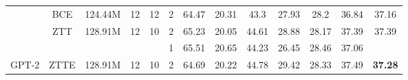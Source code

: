 \begin{table*}[ht]
\begin{tabular}{cc|c|c|c|c|ccccc|c|c}
\multicolumn{1}{c|}{}                                                                         & \multirow{-2}{*}{BCE}                         & \multirow{-2}{*}{124.44M}                         & \multirow{-2}{*}{12}                                           & \multirow{-2}{*}{12}                                              & 2                                                              & 64.47                         & 20.31                         & 43.3                          & 27.93                         & 28.2                          & 36.84                         & \multirow{-2}{*}{37.16}                                  \\ \cline{2-13} 
\multicolumn{1}{c|}{}                                                                         & ZTT                                            & 128.91M                                           & 12                                                             & 10                                                                & 2                                                              & 65.23                         & 20.05                         & 44.61                         & 28.88                         & 28.17                         & 37.39                         & 37.39                                                    \\ \cline{2-13} 
\multicolumn{1}{c|}{}                                                                         & \cellcolor[HTML]{C0C0C0}                      & \cellcolor[HTML]{C0C0C0}                          & \cellcolor[HTML]{C0C0C0}                                       & \cellcolor[HTML]{C0C0C0}                                          & \cellcolor[HTML]{C0C0C0}1                                      & \cellcolor[HTML]{C0C0C0}65.51 & \cellcolor[HTML]{C0C0C0}20.65 & \cellcolor[HTML]{C0C0C0}44.23 & \cellcolor[HTML]{C0C0C0}26.45 & \cellcolor[HTML]{C0C0C0}28.46 & \cellcolor[HTML]{C0C0C0}37.06 & \cellcolor[HTML]{C0C0C0}                                 \\
\multicolumn{1}{c|}{\multirow{-7}{*}{GPT-2}}                                                  & \multirow{-2}{*}{\cellcolor[HTML]{C0C0C0}ZTTE} & \multirow{-2}{*}{\cellcolor[HTML]{C0C0C0}128.91M} & \multirow{-2}{*}{\cellcolor[HTML]{C0C0C0}12}                   & \multirow{-2}{*}{\cellcolor[HTML]{C0C0C0}10}                      & \cellcolor[HTML]{C0C0C0}2                                      & \cellcolor[HTML]{C0C0C0}64.69 & \cellcolor[HTML]{C0C0C0}20.22 & \cellcolor[HTML]{C0C0C0}44.78 & \cellcolor[HTML]{C0C0C0}29.42 & \cellcolor[HTML]{C0C0C0}28.33 & \cellcolor[HTML]{C0C0C0}37.49 & \multirow{-2}{*}{\cellcolor[HTML]{C0C0C0}\textbf{37.28}} \\ \hline

\end{tabular}
\end{table*}
